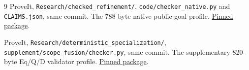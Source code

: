 \documentclass[11pt]{article}
\theoremstyle{definition}
\theoremstyle{remark}
\begin{document}
\begin{thebibliography}{9}
ProveIt, \texttt{Research/checked\_refinement/},
\texttt{code/checker\_native.py} and
\texttt{CLAIMS.json}, same commit.
The 788-byte native public-goal profile.
\href{https://github.com/VladimirReshetnikov/ProveIt/tree/9f9545f5ffd9e0392d4a36639503aca12383450a/Logic/PrimitiveRecursiveArithmetic/ConciseIPRA/Research/checked_refinement}
{Pinned package}.

ProveIt, \texttt{Research/deterministic\_specialization/},
\texttt{supplement/scope\_fusion/checker.py},
same commit. The supplementary
820-byte Eq/Q/D validator profile.
\href{https://github.com/VladimirReshetnikov/ProveIt/tree/9f9545f5ffd9e0392d4a36639503aca12383450a/Logic/PrimitiveRecursiveArithmetic/ConciseIPRA/Research/deterministic_specialization}
{Pinned package}.
\end{thebibliography}
\end{document}
